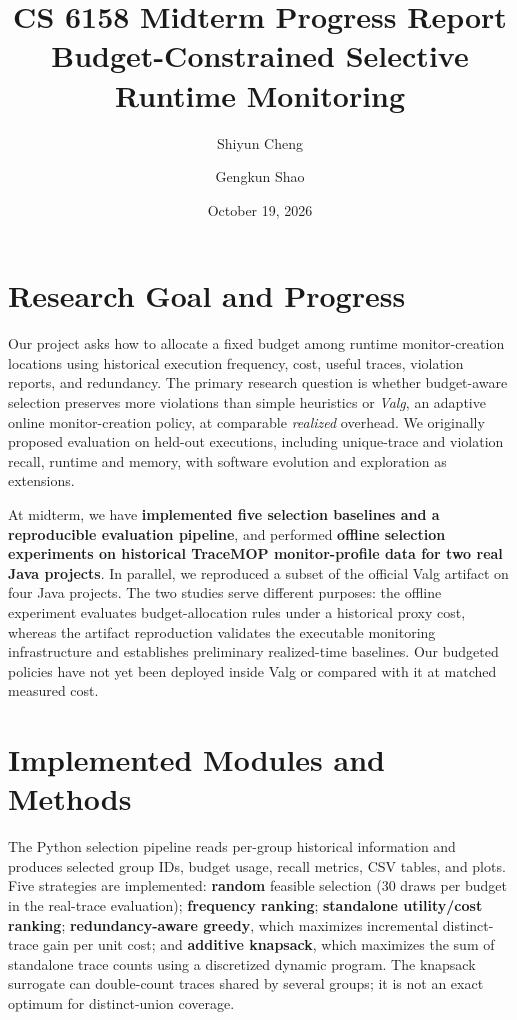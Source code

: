 \documentclass[10pt,letterpaper]{article}
\title{\vspace{-1.5em}CS 6158 Midterm Progress Report\\[3pt]
\large Budget-Constrained Selective Runtime Monitoring}
\author{Shiyun Cheng \and Gengkun Shao}
\date{October 19, 2026}
\begin{document}
\maketitle
\vspace{-1.7em}

\section{Research Goal and Progress}

Our project asks how to allocate a fixed budget among runtime monitor-creation
locations using historical execution frequency, cost, useful traces, violation
reports, and redundancy. The primary research question is whether budget-aware
selection preserves more violations than simple heuristics or \emph{Valg}, an
adaptive online monitor-creation policy, at comparable \emph{realized} overhead.
We originally proposed evaluation on held-out executions, including unique-trace
and violation recall, runtime and memory, with software evolution and exploration
as extensions.

At midterm, we have \textbf{implemented five selection baselines and a
reproducible evaluation pipeline}, and performed \textbf{offline selection
experiments on historical TraceMOP monitor-profile data for two real Java
projects}. In parallel, we reproduced a subset of the official Valg artifact on
four Java projects. The two studies serve different purposes: the offline
experiment evaluates budget-allocation rules under a historical proxy cost,
whereas the artifact reproduction validates the executable monitoring
infrastructure and establishes preliminary realized-time baselines. Our budgeted
policies have not yet been deployed inside Valg or compared with it at matched
measured cost.

\section{Implemented Modules and Methods}

The Python selection pipeline reads per-group historical information and
produces selected group IDs, budget usage, recall metrics, CSV tables, and plots.
Five strategies are implemented: \textbf{random} feasible selection (30 draws per
budget in the real-trace evaluation); \textbf{frequency ranking};
\textbf{standalone utility/cost ranking}; \textbf{redundancy-aware greedy}, which
maximizes incremental distinct-trace gain per unit cost; and \textbf{additive
knapsack}, which maximizes the sum of standalone trace counts using a discretized
dynamic program. The knapsack surrogate can double-count traces shared by
several groups; it is not an exact optimum for distinct-union coverage.
\end{document}
